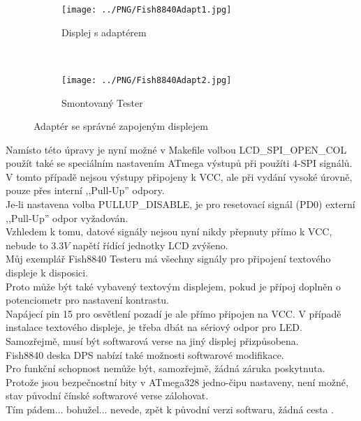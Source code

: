 \begin{figure}[H]
  \begin{subfigure}[b]{9cm}
    \centering
    \texttt{[image: ../PNG/Fish8840Adapt1.jpg]}
    \caption{Displej s adaptérem}
  \end{subfigure}
  ~
  \begin{subfigure}[b]{9cm}
    \centering
    \texttt{[image: ../PNG/Fish8840Adapt2.jpg]}
    \caption{Smontovaný Tester}
  \end{subfigure}
  \caption{Adaptér se správné zapojeným displejem}
  \label{fig:Fish8840Adapt}
\end{figure}

Namísto této úpravy je nyní možné v Makefile volbou LCD\_SPI\_OPEN\_COL použít také se speciálním nastavením
ATmega výstupů při použíti 4-SPI signálů.\\
V tomto případě nejsou výstupy připojeny k VCC, ale při vydání vysoké úrovně, pouze přes
interní ,,Pull-Up'' odpory.\\
 
Je-li nastavena volba PULLUP\_DISABLE, je pro resetovací signál (PD0) externí ,,Pull-Up'' odpor vyžadován.\\
Vzhledem k tomu, datové signály nejsou nyní nikdy přepnuty přímo k VCC, nebude to  \(3.3V\)
napětí řídící jednotky LCD zvýšeno.\\

Můj exemplář Fish8840 Testeru má všechny signály pro připojení textového displeje k disposici.\\ 
Proto může být také vybavený textovým displejem, pokud je přípoj doplněn o potenciometr pro nastavení kontrastu.\\ Napájecí pin 15 pro osvětlení pozadí je ale přímo připojen na VCC. V případě instalace textového displeje,
je třeba dbát na sériový odpor pro LED.\\
Samozřejmě, musí být softwarová verse na jiný displej přizpůsobena.\\
Fish8840 deska DPS nabízí také možnosti softwarové modifikace.\\

Pro funkční schopnost nemůže být, samozřejmě, žádná záruka poskytnuta.\\

Protože jsou bezpečnostní bity v ATmega328 jedno-čipu nastaveny, není možné,\\
stav původní čínské softwarové verse zálohovat.\\

Tím pádem... bohužel... nevede, zpět k původní verzi softwaru, žádná cesta .\\


